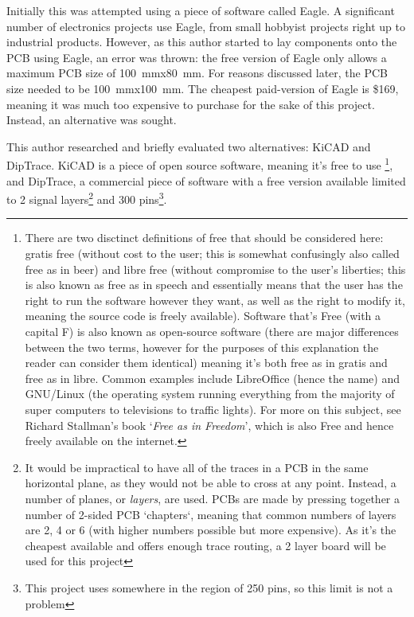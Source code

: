 Initially this was attempted using a piece of software called Eagle. A
significant number of electronics projects use Eagle, from small hobbyist
projects right up to industrial products. However, as this author started to lay
components onto the PCB using Eagle, an error was thrown: the free version
of Eagle only allows a maximum PCB size of \SI{100}{\mm}x\SI{80}{\mm}. For
reasons discussed later, the PCB size needed to be \SI{100}{\mm}x\SI{100}{\mm}.
The cheapest paid-version of Eagle is \$169, meaning it was much too expensive
to purchase for the sake of this project. Instead, an alternative was sought.

This author researched and briefly evaluated two alternatives: KiCAD and
DipTrace. KiCAD is a piece of open source software, meaning it's free to use
\footnote{There are two disctinct definitions of free that should be considered
here: gratis free (without cost to the user; this is somewhat confusingly also
called free as in beer) and libre free (without compromise to the user's
liberties; this is also known as free as in speech and essentially means that
the user has the right to run the software however they want, as well as the
right to modify it, meaning the source code is freely available).  Software
that's Free (with a capital F) is also known as open-source software (there are
major differences between the two terms, however for the purposes of this
explanation the reader can consider them identical) meaning it's both free as in
gratis and free as in libre. Common examples include LibreOffice (hence the
name) and GNU/Linux (the operating system running everything from the majority
of super computers to televisions to traffic lights). For more on this subject,
see Richard Stallman's book `\textit{Free as in Freedom}', which is also Free
and hence freely available on the internet.}, and DipTrace, a commercial piece
of software with a free version available limited to 2 signal layers\footnote{It
would be impractical to have all of the traces in a PCB in the same horizontal
plane, as they would not be able to cross at any point. Instead, a number of
planes, or \textit{layers}, are used.  PCBs are made by pressing together a
number of 2-sided PCB `chapters`, meaning that common numbers of layers are 2, 4
or 6 (with higher numbers possible but more expensive). As it's the cheapest
available and offers enough trace routing, a 2 layer board will be used for this
project} and 300 pins\footnote{This project uses somewhere in the region of 250
pins, so this limit is not a problem}.


